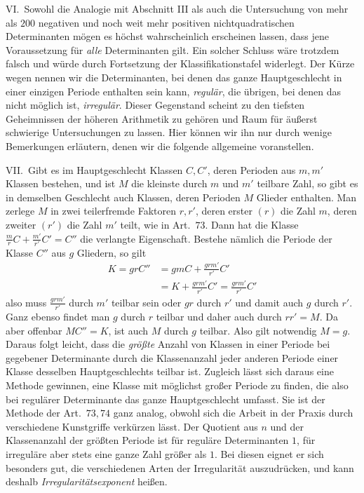 
VI.\ Sowohl die Analogie mit Abschnitt III als auch die Untersuchung von mehr als \(200\) negativen und noch weit mehr positiven nichtquadratischen Determinanten mögen es höchst wahrscheinlich erscheinen lassen, dass jene Voraussetzung für \textit{alle} Determinanten gilt. Ein solcher Schluss wäre trotzdem falsch und würde durch Fortsetzung der Klassifikationstafel widerlegt. Der Kürze wegen nennen wir die Determinanten, bei denen das ganze Hauptgeschlecht in einer einzigen Periode enthalten sein kann, \textit{regulär}, die übrigen, bei denen das nicht möglich ist, \textit{irregulär}. Dieser Gegenstand scheint zu den tiefsten Geheimnissen der höheren Arithmetik zu gehören und Raum für äußerst schwierige Untersuchungen zu lassen. Hier können wir ihn nur durch wenige Bemerkungen erläutern, denen wir die folgende allgemeine voranstellen.

VII.\ Gibt es im Hauptgeschlecht Klassen \(C,C'\), deren Perioden aus \(m,m'\) Klassen bestehen, und ist \(M\) die kleinste durch \(m\) und \(m'\) teilbare Zahl, so gibt es in demselben Geschlecht auch Klassen, deren Perioden \(M\) Glieder enthalten. Man zerlege \(M\) in zwei teilerfremde Faktoren \(r,r'\), deren erster \((r)\) die Zahl \(m\), deren zweiter \((r')\) die Zahl \(m'\) teilt, wie in Art.\ \(73\). Dann hat die Klasse \(\frac mrC+\frac{m'}{r'}C'=C''\) die verlangte Eigenschaft. Bestehe nämlich die Periode der Klasse \(C''\) aus \(g\) Gliedern, so gilt
\[\begin{aligned}K=grC''&=gmC+\frac{grm'}{r'}C'\\&=K+\frac{grm'}{r'}C'=\frac{grm'}{r'}C'\end{aligned}\]
also muss \(\frac{grm'}{r'}\) durch \(m'\) teilbar sein oder \(gr\) durch \(r'\) und damit auch \(g\) durch \(r'\). Ganz ebenso findet man \(g\) durch \(r\) teilbar und daher auch durch \(rr'=M\). Da aber offenbar \(MC''=K\), ist auch \(M\) durch \(g\) teilbar. Also gilt notwendig \(M=g\). Daraus folgt leicht, dass die \textit{größte} Anzahl von Klassen in einer Periode bei gegebener Determinante durch die Klassenanzahl jeder anderen Periode einer Klasse desselben Hauptgeschlechts teilbar ist. Zugleich lässt sich daraus eine Methode gewinnen, eine Klasse mit möglichst großer Periode zu finden, die also bei regulärer Determinante das ganze Hauptgeschlecht umfasst. Sie ist der Methode der Art.\ \(73,74\) ganz analog, obwohl sich die Arbeit in der Praxis durch verschiedene Kunstgriffe verkürzen lässt. Der Quotient aus \(n\) und der Klassenanzahl der größten Periode ist für reguläre Determinanten \(1\), für irreguläre aber stets eine ganze Zahl größer als \(1\). Bei diesen eignet er sich besonders gut, die verschiedenen Arten der Irregularität auszudrücken, und kann deshalb \textit{Irregularitätsexponent} heißen.

